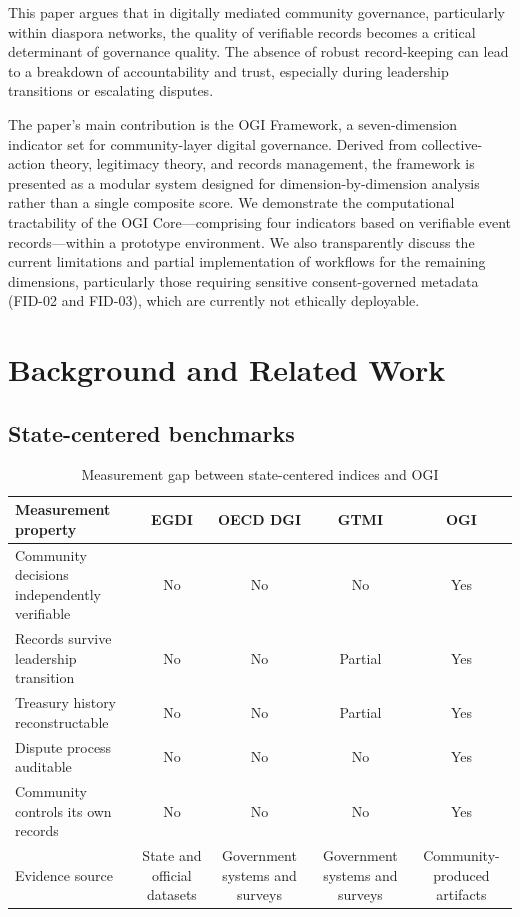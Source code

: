 \documentclass[sigconf,anonymous]{acmart}
\begin{document}
This paper argues that in digitally mediated community governance, particularly within diaspora networks, the quality of verifiable records becomes a critical determinant of governance quality. The absence of robust record-keeping can lead to a breakdown of accountability and trust, especially during leadership transitions or escalating disputes.

The paper’s main contribution is the OGI Framework, a seven-dimension indicator set for community-layer digital governance. Derived from collective-action theory, legitimacy theory, and records management, the framework is presented as a modular system designed for dimension-by-dimension analysis rather than a single composite score. We demonstrate the computational tractability of the OGI Core—comprising four indicators based on verifiable event records—within a prototype environment. We also transparently discuss the current limitations and partial implementation of workflows for the remaining dimensions, particularly those requiring sensitive consent-governed metadata (FID-02 and FID-03), which are currently not ethically deployable.

\section{Background and Related Work}

\subsection{State-centered benchmarks}

\begin{table}[t]
\caption{Measurement gap between state-centered indices and OGI}
\label{tab:gap}
\small
\begin{tabularx}{\textwidth}{Ycccc}
\toprule
Measurement property & EGDI & OECD DGI & GTMI & OGI \\
\midrule
Community decisions independently verifiable & No & No & No & Yes \\
Records survive leadership transition & No & No & Partial & Yes \\
Treasury history reconstructable & No & No & Partial & Yes \\
Dispute process auditable & No & No & No & Yes \\
Community controls its own records & No & No & No & Yes \\
Evidence source & State and official datasets & Government systems and surveys & Government systems and surveys & Community-produced artifacts \\
\bottomrule
\end{tabularx}
\end{table}
\end{document}
